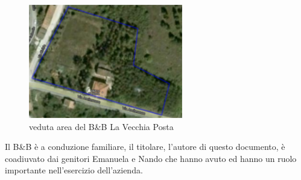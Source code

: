 \documentclass[a4paper,12pt,hidelinks]{report}
\begin{document}
  \begin{figure}[h!]%
    \includegraphics[width=0.6\textwidth,keepaspectratio=true]{../img/bbArea1}
    \centering
    \caption{veduta area del B\&B La Vecchia Posta}%
    \label{fig:bbArea}%
  \end{figure}
  Il B\&B è a conduzione familiare, il titolare, l'autore di questo documento, è coadiuvato dai genitori Emanuela e Nando che hanno avuto ed hanno un ruolo importante 
  nell'esercizio dell'azienda.
\end{document}
